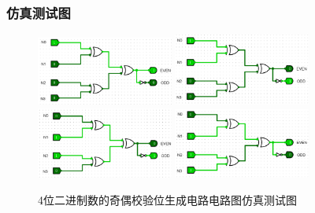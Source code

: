 \documentclass{article}
\begin{document}
    \subsubsection{仿真测试图}

    \begin{figure}[H]
        \centering
        \includegraphics[width=0.4\textwidth]{10.4.1.png}
        \includegraphics[width=0.4\textwidth]{10.4.2.png}
        \includegraphics[width=0.4\textwidth]{10.4.3.png}
        \includegraphics[width=0.4\textwidth]{10.4.4.png}
        \caption{4位二进制数的奇偶校验位生成电路电路图仿真测试图}
        \end{figure}
\end{document}
